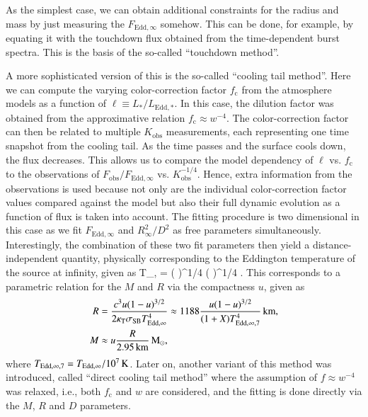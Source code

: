 As the simplest case, we can obtain additional constraints for the radius and mass by just measuring the $F_{\mathrm{Edd},\infty}$ somehow.
This can be done, for example, by equating it with the touchdown flux obtained from the time-dependent burst spectra.
This is the basis of the so-called ``touchdown method''.\cite{Ebi87, vParadijs90, Ozel06, Ozel16}

A more sophisticated version of this is the so-called ``cooling tail method''.\cite{SPRW11, PNK14}
Here we can compute the varying color-correction factor $f_{\mathrm{c}}$ from the atmosphere models as a function of $\ell \equiv L_*/L_{\mathrm{Edd,*}}$.
In this case, the dilution factor was obtained from the approximative relation $f_{\mathrm{c}} \approx w^{-4}$.
The color-correction factor can then be related to multiple $K_{\mathrm{obs}}$ measurements, each representing  one time snapshot from the cooling tail.
As the time passes and the surface cools down, the flux decreases.
This allows us to compare the model dependency of $\ell$ vs. $f_{\mathrm{c}}$ to the observations of $F_{\mathrm{obs}} / F_{\mathrm{Edd}, \infty}$ vs. $K_{\mathrm{obs}}^{-1/4}$.
Hence, extra information from the observations is used because not only are the individual color-correction factor values compared against the model but also their full dynamic evolution as a function of flux is taken into account.
The fitting procedure is two dimensional in this case as we fit $F_{\mathrm{Edd},\infty}$ and $R_{\infty}^2/D^2$ as free parameters simultaneously.
Interestingly, the combination of these two fit parameters then yield a distance-independent quantity, physically corresponding to the Eddington temperature of the source at infinity, given as
\be
T_{,\infty} 
= 
\left(  \right)^{1/4}
\left(   \right)^{1/4} 
\Kelvin.
\ee
This corresponds to a parametric relation for the $M$ and $R$ via the compactness $u$, given as
\begin{align}\begin{split}
R &= \frac{c^3 u(1-u)^{3/2}}{2\kappa_{\mathrm{T}} \sigma_{\mathrm{SB}} T_{\mathrm{Edd},\infty}^4} 
\approx 1188 \frac{u(1-u)^{3/2}}{(1+X) T_{\mathrm{Edd},\infty, 7}^4} \, \mathrm{km}, \\
M &\approx u \frac{R}{2.95\, \mathrm{km}} \, \mathrm{M}_{\odot}, \\
\end{split}\end{align}
where $T_{\mathrm{Edd},\infty,7} = T_{\mathrm{Edd}, \infty} / 10^7 \, \mathrm{K}$.
Later on, another variant of this method was introduced, called ``direct cooling tail method'' where the assumption of $f \approx w^{-4}$ was relaxed, i.e., both $f_{\mathrm{c}}$ and $w$ are considered, and the fitting is done directly via the $M$, $R$ and $D$ parameters.\cite{NSK16, SPN17} 


